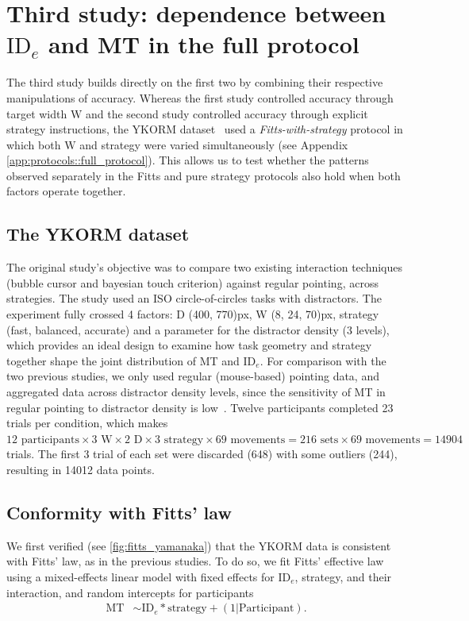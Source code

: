 \documentclass[acmlarge, manuscript,review]{acmart}
\newcommand{\mt}{\ensuremath{{\text{MT}}}\xspace}
\newcommand{\ide}{\ensuremath{{\text{ID}_e}}\xspace}
\newcommand{\W}{\ensuremath{{\text{W}}}\xspace}
\begin{document}
\section{ Third study: dependence between \ide and MT in the full protocol \label{sec:yamanaka}}
The third study builds directly on the first two by combining their respective manipulations of accuracy. Whereas the first study controlled accuracy through target width \W and the second study controlled accuracy through explicit strategy instructions, the YKORM dataset~\cite{yamanaka2023} used a \textit{Fitts-with-strategy} protocol in which both \W and strategy were varied simultaneously (see Appendix \ref{app:protocols::full_protocol}). This allows us to test whether the patterns observed separately in the Fitts and pure strategy protocols also hold when both factors operate together.

\subsection{The YKORM dataset}
The original study's objective was to compare two existing interaction techniques (bubble cursor and bayesian touch criterion) against regular pointing, across strategies.
The study used an ISO circle-of-circles tasks with distractors.
The experiment fully crossed 4 factors: D (400, 770)px, W (8, 24, 70)px, strategy (fast, balanced, accurate) and a parameter for the distractor density (3 levels), which provides an ideal design to examine how task geometry and strategy together shape the joint distribution of MT and \ide.
For comparison with the two previous studies, we only used regular (mouse-based) pointing data, and aggregated data across distractor density levels, since the sensitivity of MT in regular pointing to distractor density is low~\cite[Table 2]{blanch2011}.
Twelve participants completed 23 trials per condition, which makes $12 \text{ participants} \times 3 \text{ W} \times 2 \text{ D} \times 3 \text{ strategy} \times 69 \text{ movements} = 216 \text{ sets} \times 69 \text{ movements} = 14904$ trials. The first 3 trial of each set were discarded (648) with some outliers (244), resulting in 14012 data points.

\subsection{Conformity with Fitts' law}
We first verified (see \autoref{fig:fitts_yamanaka}) that the YKORM data is consistent with Fitts' law, as in the previous studies. To do so, we fit Fitts' effective law using a mixed-effects linear model with fixed effects for \ide, strategy, and their interaction, and random intercepts for participants
\begin{align}
  \mt & \sim \ide * \text{strategy} + (1|\text{Participant}).
\end{align}
\end{document}
